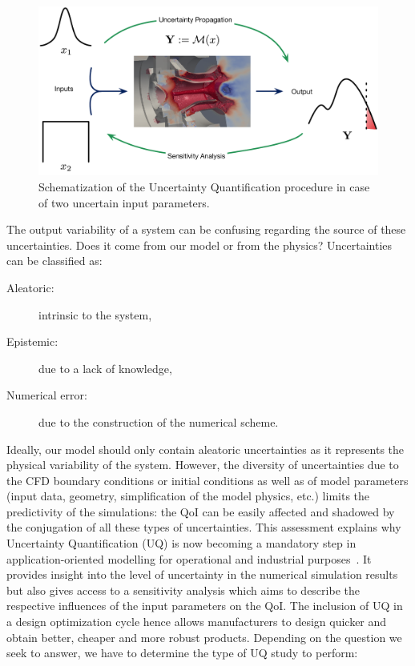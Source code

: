 \begin{figure}[!ht]
\centering
\includegraphics[width=\linewidth,keepaspectratio]{fig/literature/schema_UQ.pdf}
\caption{Schematization of the Uncertainty Quantification procedure in case of two uncertain input parameters.}
\label{fig:context}
\end{figure}

The output variability of a system can be confusing regarding the source of these uncertainties. Does it come from our model or from the physics? Uncertainties can be classified as:

\begin{description}
	\item [Aleatoric:] intrinsic to the system,
	\item [Epistemic:] due to a lack of knowledge,%
	\item [Numerical error:] due to the construction of the numerical scheme.
\end{description}

Ideally, our model should only contain aleatoric uncertainties as it represents the physical variability of the system. However, the diversity of uncertainties due to the CFD boundary conditions or initial conditions as well as of model parameters (input data, geometry, simplification of the model physics, etc.) limits the predictivity of the simulations: the QoI can be easily affected and shadowed by the conjugation of all these types of uncertainties. This assessment explains why Uncertainty Quantification (UQ) is now becoming a mandatory step in application-oriented modelling for operational and industrial purposes~\cite{degennaro2015,masquelet2017}. It provides insight into the level of uncertainty in the numerical simulation results but also gives access to a sensitivity analysis which aims to describe the respective influences of the input parameters on the QoI. The inclusion of UQ in a design optimization cycle hence allows manufacturers to design quicker and obtain better, cheaper and more robust products. Depending on the question we seek to answer, we have to determine the type of UQ study to perform:

